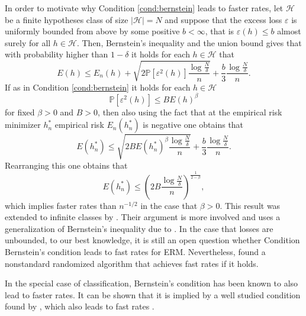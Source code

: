 \documentclass{uvamath}
\newcommand*{\calH}{\mathcal{H}}
\newcommand*{\bbP}{\mathbb{P}}
\newcommand*{\paren}[1]{\left(#1\right)}
\theoremstyle{remark}
\theoremstyle{definition}
\theoremstyle{definition}
\theoremstyle{definition}
\theoremstyle{definition}
\theoremstyle{definition}
\begin{document}
In order to motivate why Condition \ref{cond:bernstein} leads to
faster rates, let $\calH$ be a finite hypotheses class of size
$|\calH| = N$ and suppose that the excess loss $\varepsilon$ is
uniformly bounded from above by some positive $b<\infty$, that is
$\varepsilon(h) \leq b$ almost surely for all $h\in\calH$.  Then,
Bernstein's inequality and the union bound gives that with probability
higher than $1-\delta$ it holds for each $h\in\calH$ that
\begin{equation*}
  E(h) \leq E_n(h) +
  \sqrt{2\bbP[\varepsilon^2(h)]\frac{\log\frac{N}{\delta}}{n}} +
  \frac{b}{3}\frac{\log\frac{N}{\delta}}{n}.
\end{equation*}
If as in Condition \ref{cond:bernstein} it holds for each $h\in\calH$
\begin{equation*}
  \bbP[\varepsilon^2(h)]\leq B E(h)^\beta
\end{equation*}
for fixed $\beta > 0$ and $B>0$, then also using the fact that at the
empirical risk minimizer $h^*_n$ empirical risk $E_n(h^*_n)$ is
negative one obtains that
\begin{equation*}
  E(h^*_n) \leq
  \sqrt{2BE(h^*_n)^\beta\frac{\log\frac{N}{\delta}}{n}} +
  \frac{b}{3}\frac{\log\frac{N}{\delta}}{n}.
\end{equation*}
Rearranging this one obtains that
\begin{equation*}
  E(h^*_n) \leq \paren{2B\frac{\log\frac{N}{\delta}}{n}}^{\frac{1}{2-\beta}},
\end{equation*}
which implies faster rates than $n^{-1/2}$ in the case that
$\beta>0$. This result was extended to infinite classes by
\citet{bartlett_empirical_2006}. Their argument is more involved and
uses a generalization of Bernstein's inequality due to
\citet{talagrand_sharper_1994}. In the case that losses are unbounded,
to our best knowledge, it is still an open question whether Condition
Bernstein's condition leads to fast rates for ERM. Nevertheless,
\citet{audibert_fast_2009} found a nonstandard randomized algorithm
that achieves fast rates if it holds.

In the special case of classification, Bernstein's condition has been
known to also lead to faster rates. It can be shown that it is implied
by a well studied condition found by \citet{mammen_smooth_1999}, which
also leads to fast rates \citep[see also][Section
5]{boucheron_theory_2005}.
\end{document}
